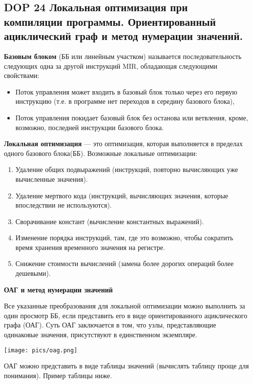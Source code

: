 \subsection{DOP 24 Локальная  оптимизация при  компиляции  программы. Ориентированный  ациклический  граф  и  метод нумерации значений.}

\textbf{Базовым блоком} (ББ или линейным участком) называется последовательность следующих одна за другой инструкций MIR, обладающая следующими свойствами:
\begin{itemize}
    \item Поток управления может входить в базовый блок только через его первую инструкцию (т.е. в программе нет переходов в середину базового блока),
    \item Поток управления покидает базовый блок без останова или ветвления, кроме, возможно, последней инструкции базового блока.
\end{itemize}

\textbf{Локальная оптимизация} --- это оптимизация, которая выполняется в пределах одного базового блока(ББ). Возможные локальные оптимизации:
\begin{enumerate}
    \item Удаление общих подвыражений (инструкций, повторно вычисляющих уже вычисленные значения).
    \item Удаление мертвого кода (инструкций, вычисляющих значения, которые впоследствии не используются).
    \item Сворачивание констант (вычисление константных выражений).
    \item Изменение порядка инструкций, там, где это возможно, чтобы сократить время хранения временного значения на регистре.
    \item Снижение стоимости вычислений (замена более дорогих операций более дешевыми).
\end{enumerate}

\textbf{ОАГ и метод нумерации значений}

Все указанные преобразования для локальной оптимизации можно выполнить за один просмотр ББ, если представить его в виде ориентированного ациклического графа (ОАГ). 
Суть ОАГ заключается в том, что узлы, представляющие одинаковые значения, присутствуют в единственном экземпляре.

\texttt{[image: pics/oag.png]}

ОАГ можно представить в виде таблицы значений (вычислять таблицу проще для понимания). Пример таблицы ниже.

